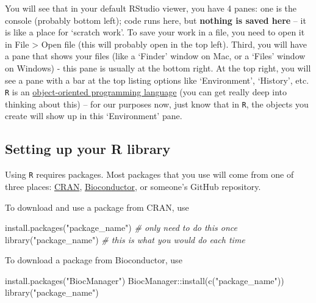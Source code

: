 \documentclass[
]{book}
\newenvironment{Shaded}{\begin{snugshade}}{\end{snugshade}}
\newcommand{\CommentTok}[1]{\textcolor[rgb]{0.56,0.35,0.01}{\textit{#1}}}
\newcommand{\FunctionTok}[1]{\textcolor[rgb]{0.00,0.00,0.00}{#1}}
\newcommand{\NormalTok}[1]{#1}
\newcommand{\SpecialCharTok}[1]{\textcolor[rgb]{0.00,0.00,0.00}{#1}}
\newcommand{\StringTok}[1]{\textcolor[rgb]{0.31,0.60,0.02}{#1}}
\begin{document}
You will see that in your default RStudio viewer, you have 4 panes: one is the console (probably bottom left); code runs here, but \textbf{nothing is saved here} -- it is like a place for `scratch work'. To save your work in a file, you need to open it in File \textgreater{} Open file (this will probably open in the top left). Third, you will have a pane that shows your files (like a `Finder' window on Mac, or a `Files' window on Windows) - this pane is usually at the bottom right. At the top right, you will see a pane with a bar at the top listing options like `Environment', `History', etc. \texttt{R} is an \href{https://en.wikipedia.org/wiki/Object-oriented_programming}{object-oriented programming language} (you can get really deep into thinking about this) -- for our purposes now, just know that in \texttt{R}, the objects you create will show up in this `Environment' pane.

\hypertarget{setting-up-your-r-library}{%
\subsection{Setting up your R library}\label{setting-up-your-r-library}}

Using \texttt{R} requires packages. Most packages that you use will come from one of three places: \href{https://cran.r-project.org/}{CRAN}, \href{https://www.bioconductor.org/}{Bioconductor}, or someone's GitHub repository.

To download and use a package from CRAN, use

\begin{Shaded}
\begin{Highlighting}[]
\FunctionTok{install.packages}\NormalTok{(}\StringTok{"package\_name"}\NormalTok{) }\CommentTok{\# only need to do this once }
\FunctionTok{library}\NormalTok{(}\StringTok{"package\_name"}\NormalTok{) }\CommentTok{\# this is what you would do each time }
\end{Highlighting}
\end{Shaded}

To download a package from Bioconductor, use

\begin{Shaded}
\begin{Highlighting}[]
\FunctionTok{install.packages}\NormalTok{(}\StringTok{"BiocManager"}\NormalTok{) }
\NormalTok{BiocManager}\SpecialCharTok{::}\FunctionTok{install}\NormalTok{(}\FunctionTok{c}\NormalTok{(}\StringTok{"package\_name"}\NormalTok{))}
\FunctionTok{library}\NormalTok{(}\StringTok{"package\_name"}\NormalTok{)}
\end{Highlighting}
\end{Shaded}
\end{document}
